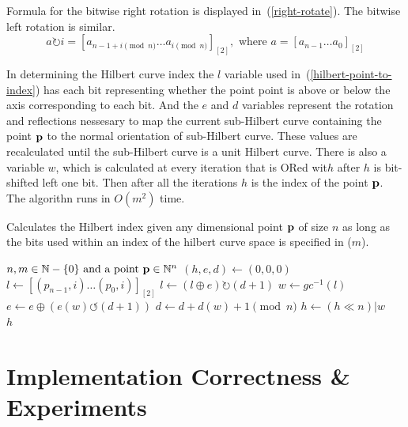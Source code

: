 \documentclass[10pt]{article}
\begin{document}
Formula for the bitwise right rotation is displayed in~(\ref{right-rotate}). The bitwise left rotation is similar.
\begin{equation}
  \label{right-rotate}
  a \rightturn i = \left[ a_{{n - 1 + i}\pmod{n}} \ldots a_{i\pmod{n}} \right]_{\left[ 2 \right]}, \text{ where } a = \left[ a_{n-1} \ldots a_0\right]_{\left[ 2 \right]} 
\end{equation}

In determining the Hilbert curve index the $l$ variable used in~(\ref{hilbert-point-to-index}) has each bit representing whether the point point is above or below the axis corresponding to each bit. And the $e$ and $d$ variables represent the rotation and reflections nessesary to map the current sub-Hilbert curve containing the point ${\bf p}$ to the normal orientation of sub-Hilbert curve. These values are recalculated until the sub-Hilbert curve is a unit Hilbert curve. There is also a variable $w$, which is calculated at every iteration that is ORed wit$h$ after $h$ is bit-shifted left one bit. Then after all the iterations $h$ is the index of the point ${\bf p}$. The algorithn runs in $O(m^2)$ time.

\begin{algorithm}
  \caption{Calculates the Hilbert index given any dimensional point ${\bf p}$ 
    of size $n$ as long as the bits used within an index of the hilbert curve 
    space is specified in ($m$).}
  \label{hilbert-point-to-index}
  \begin{algorithmic}[1]
    \Require $n, m \in \mathbb{N} - \{0\} \text{ and a point } {\bf p} \in \mathbb{N}^n$ 
    \State $ \left( h, e, d \right) \leftarrow \left( 0, 0, 0 \right) $
    \State $ l \leftarrow \left[ \left( p_{n-1} , i \right) \ldots \left( p_0 , i \right) \right]_{\left[ 2 \right]} $ 
    \State $ l \leftarrow \left( l \oplus e \right) \rightturn \left( d+1 \right)$ 
    \State $ w \leftarrow gc^{-1} \left( l \right)$ 
    \State $ e \leftarrow e \oplus \left( e \left( w \right) \leftturn \left( d+ 1 \right) \right) $ 
    \State $ d \leftarrow d + d \left( w \right) + 1 \pmod{n}$ 
    \State $ h \leftarrow \left( h \ll n \right) | w $
    \EndFor \\
    \Return $h $%

  \end{algorithmic}
\end{algorithm}

\section{Implementation Correctness \& Experiments}
\end{document}
